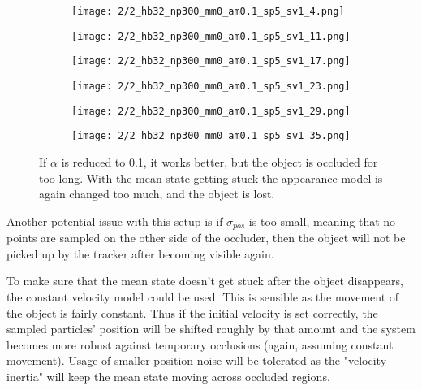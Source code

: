 \documentclass[10pt,a4paper,twoside]{article}
\newcommand{\sweepsize}{0.26}
\begin{document}
\begin{figure}[h]
    \centering
    \begin{subfigure}{\sweepsize\textwidth}
    \texttt{[image: 2/2\_hb32\_np300\_mm0\_am0.1\_sp5\_sv1\_4.png]} 
    \end{subfigure}
    \begin{subfigure}{\sweepsize\textwidth}
    \texttt{[image: 2/2\_hb32\_np300\_mm0\_am0.1\_sp5\_sv1\_11.png]} 
    \end{subfigure}
    \begin{subfigure}{\sweepsize\textwidth}
    \texttt{[image: 2/2\_hb32\_np300\_mm0\_am0.1\_sp5\_sv1\_17.png]} 
    \end{subfigure}
    \begin{subfigure}{\sweepsize\textwidth}
    \texttt{[image: 2/2\_hb32\_np300\_mm0\_am0.1\_sp5\_sv1\_23.png]} 
    \end{subfigure}
    \begin{subfigure}{\sweepsize\textwidth}
    \texttt{[image: 2/2\_hb32\_np300\_mm0\_am0.1\_sp5\_sv1\_29.png]} 
    \end{subfigure}
    \begin{subfigure}{\sweepsize\textwidth}
    \texttt{[image: 2/2\_hb32\_np300\_mm0\_am0.1\_sp5\_sv1\_35.png]} 
    \end{subfigure}
    \caption{If $\alpha$ is reduced to 0.1, it works better, but the object is
    occluded for too long. With the mean state getting stuck  the appearance
    model is again changed too much, and the object is lost.}
\end{figure}

Another potential issue with this setup is if $\sigma_{pos}$ is too small,
meaning that no points are sampled on the other side of the occluder, then the object
will not be picked up by the tracker after becoming visible again.

To make sure that the mean state doesn't get stuck after the object disappears, the
constant velocity model could be used. This is sensible as the movement of the
object is fairly constant. Thus if the initial velocity is set correctly, the
sampled particles' position will be shifted roughly by that amount and the
system becomes more robust against temporary occlusions (again, assuming
constant movement). Usage of smaller position noise will be tolerated as the "velocity
inertia" will keep the mean state moving across occluded regions.
\end{document}
